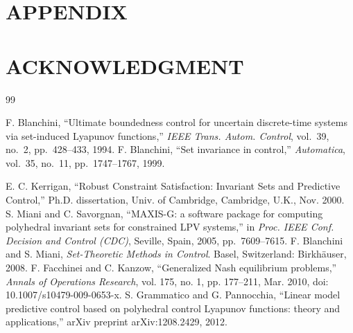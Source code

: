 \documentclass[letterpaper, 10 pt, conference]{ieeeconf}  %
\begin{document}
\section*{APPENDIX}

\section*{ACKNOWLEDGMENT}

\begin{thebibliography}{99}

F. Blanchini, ``Ultimate boundedness control for uncertain discrete-time systems via set-induced Lyapunov functions,'' \emph{IEEE Trans. Autom. Control}, vol.~39, no.~2, pp.~428--433, 1994.
F. Blanchini, ``Set invariance in control,'' \emph{Automatica}, vol.~35, no.~11, pp.~1747--1767, 1999.

E. C. Kerrigan, ``Robust Constraint Satisfaction: Invariant Sets and Predictive Control,''
Ph.D. dissertation, Univ. of Cambridge, Cambridge, U.K., Nov. 2000.
S. Miani and C. Savorgnan, ``MAXIS-G: a software package for computing polyhedral invariant sets for constrained LPV systems,'' in \emph{Proc. IEEE Conf. Decision and Control (CDC)}, Seville, Spain, 2005, pp.~7609--7615.
F. Blanchini and S. Miani, \emph{Set-Theoretic Methods in Control}. Basel, Switzerland: Birkh\"auser, 2008.
 F. Facchinei and C. Kanzow, ``Generalized Nash equilibrium problems,'' \emph{Annals of Operations Research}, vol. 175, no. 1, pp. 177--211, Mar. 2010, doi: 10.1007/s10479-009-0653-x.
S. Grammatico and G. Pannocchia, ``Linear model predictive control based on polyhedral control Lyapunov functions: theory and applications,'' arXiv preprint arXiv:1208.2429, 2012.

\end{thebibliography}
\end{document}
